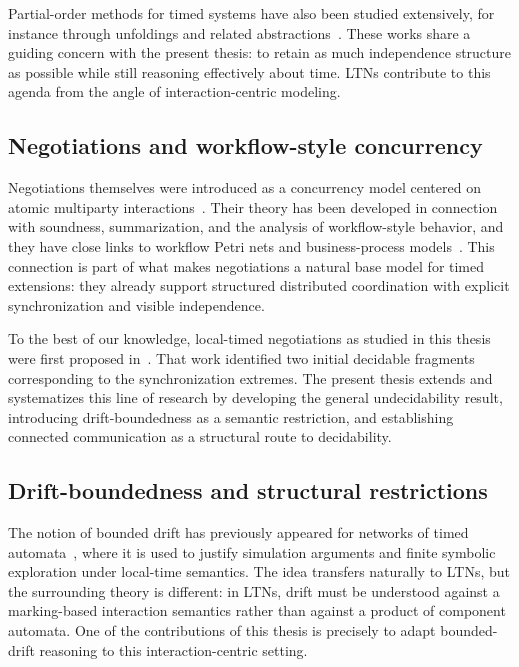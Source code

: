 Partial-order methods for timed systems have also been studied extensively, for instance through unfoldings and related abstractions~\cite{EsparzaUnfoldings,KhomenkoTimePN}. These works share a guiding concern with the present thesis: to retain as much independence structure as possible while still reasoning effectively about time. LTNs contribute to this agenda from the angle of interaction-centric modeling.

\subsection{Negotiations and workflow-style concurrency}

Negotiations themselves were introduced as a concurrency model centered on atomic multiparty interactions~\cite{EsparzaDeselNegotiations}. Their theory has been developed in connection with soundness, summarization, and the analysis of workflow-style behavior, and they have close links to workflow Petri nets and business-process models~\cite{EsparzaWorkflow,EsparzaFreeChoice}. This connection is part of what makes negotiations a natural base model for timed extensions: they already support structured distributed coordination with explicit synchronization and visible independence.

To the best of our knowledge, local-timed negotiations as studied in this thesis were first proposed in~\cite{LTNOriginal}. That work identified two initial decidable fragments corresponding to the synchronization extremes. The present thesis extends and systematizes this line of research by developing the general undecidability result, introducing drift-boundedness as a semantic restriction, and establishing connected communication as a structural route to decidability.

\subsection{Drift-boundedness and structural restrictions}

The notion of bounded drift has previously appeared for networks of timed automata~\cite{DriftTA1,DriftTA2}, where it is used to justify simulation arguments and finite symbolic exploration under local-time semantics. The idea transfers naturally to LTNs, but the surrounding theory is different: in LTNs, drift must be understood against a marking-based interaction semantics rather than against a product of component automata. One of the contributions of this thesis is precisely to adapt bounded-drift reasoning to this interaction-centric setting.

